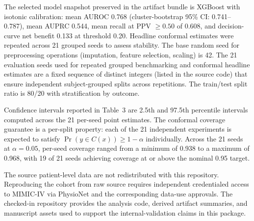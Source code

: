 \begin{appendices}
The selected model snapshot preserved in the artifact bundle is XGBoost with isotonic calibration: mean AUROC 0.768 (cluster-bootstrap 95\% CI: 0.741--0.787), mean AUPRC 0.544, mean recall at PPV $\geq 0.50$ of 0.608, and decision-curve net benefit 0.133 at threshold 0.20. Headline conformal estimates were repeated across 21 grouped seeds to assess stability. The base random seed for preprocessing operations (imputation, feature selection, scaling) is 42. The 21 evaluation seeds used for repeated grouped benchmarking and conformal headline estimates are a fixed sequence of distinct integers (listed in the source code) that ensure independent subject-grouped splits across repetitions. The train/test split ratio is 80/20 with stratification by outcome.

Confidence intervals reported in Table~3 are 2.5th and 97.5th percentile intervals computed across the 21 per-seed point estimates. The conformal coverage guarantee is a per-split property: each of the 21 independent experiments is expected to satisfy $\Pr(y \in C(x)) \geq 1 - \alpha$ individually. Across the 21 seeds at $\alpha = 0.05$, per-seed coverage ranged from a minimum of 0.938 to a maximum of 0.968, with 19 of 21 seeds achieving coverage at or above the nominal 0.95 target.

The source patient-level data are not redistributed with this repository. Reproducing the cohort from raw source requires independent credentialed access to MIMIC-IV via PhysioNet and the corresponding data-use approvals. The checked-in repository provides the analysis code, derived artifact summaries, and manuscript assets used to support the internal-validation claims in this package.

\end{appendices}
